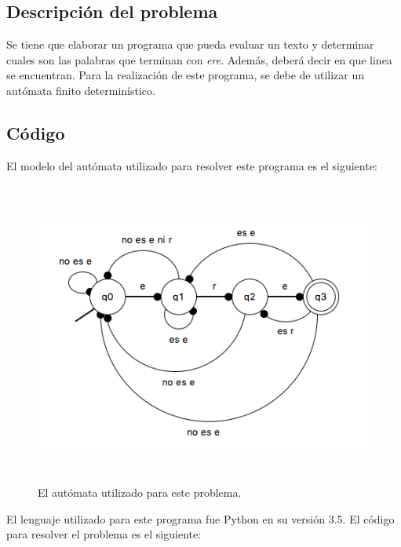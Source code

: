 \documentclass[12pt]{article}
\begin{document}
\subsection{Descripción del problema}
Se tiene que elaborar un programa que pueda evaluar un texto y determinar cuales son las palabras que terminan con \textit{ere}. Además, deberá decir en que linea se encuentran. Para la realización de este programa, se debe de utilizar un autómata finito determinístico.


\subsection{Código}
El modelo del autómata utilizado para resolver este programa es el siguiente:

\begin{figure}[H]
\includegraphics[width=\textwidth, height=10cm]{automata_ere}
\caption{El autómata utilizado para este problema.}
\label{fig:automata_ere_modelo}
\end{figure}

El lenguaje utilizado para este programa fue Python en su versión 3.5. El código para resolver el problema es el siguiente:\\
\end{document}
